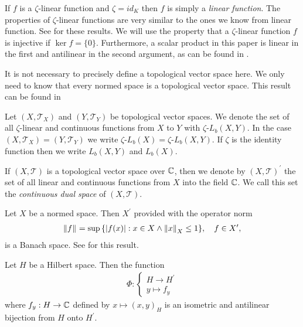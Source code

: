 \begin{remark}
	If $f$ is a $\zeta$-linear function and $\zeta = id_K$ then $f$ is simply a \textit{linear function}. The properties of $\zeta$-linear functions are very similar to the ones we know from linear function. See \cite[p. 138]{LinAG1&2} for these results. We will use the property that a $\zeta$-linear function $f$ is injective if $\ker f = \{0\}$. Furthermore, a scalar product in this paper is linear in the first and antilinear in the second argument, as can be found in \cite[p. 41]{FAna1}.
\end{remark}


It is not necessary to precisely define a topological vector space here. We only need to know that every normed space is a topological vector space. This result can be found in \cite[p. 18]{FAna1}


\begin{definition}
	Let $(X,\mathcal{T}_X)$ and $(Y,\mathcal{T}_Y)$ be topological vector spaces. We denote the set of all $\zeta$-linear and continuous functions from $X$ to $Y$ with $\zeta$-$L_b(X,Y)$. In the case $(X, \mathcal{T}_X) = (Y, \mathcal{T}_Y)$ we write $\zeta$-$L_b(X) = \zeta$-$L_b(X,Y)$. If $\zeta$ is the identity function then we write $L_b(X,Y)$ and $L_b(X)$.
\end{definition}


\begin{definition}
	If $(X, \mathcal{T})$ is a topological vector space over $\C$, then we denote by $(X, \mathcal{T})^\prime$ the set of all linear and continuous functions from $X$ into the field $\C$. We call this set the \textit{continuous dual space} of $(X, \mathcal{T})$.
\end{definition}

\begin{remark}
	Let $X$ be a normed space. Then $X^\prime$ provided with the operator norm 
	\begin{align*}
		\norm{f} = \sup\Bbraces{\vbraces{f(x)} : x \in X \land \norm[X]{x} \leq 1}, \quad f \in X^\prime,
	\end{align*}
	is a Banach space. See \cite[p. 25]{FAna1} for this result.
\end{remark}


\begin{proposition} \label{prop:riesz}
	Let $H$ be a Hilbert space. Then the function
	\begin{align*}
		\Phi: 
		\begin{cases}
			H \to H^\prime \\
			y \mapsto f_y
		\end{cases}
	\end{align*}
	where $f_y: H \to \C$ defined by $x \mapsto (x,y)_H$ is an isometric and antilinear bijection from $H$ onto $H^\prime$. 
\end{proposition}

